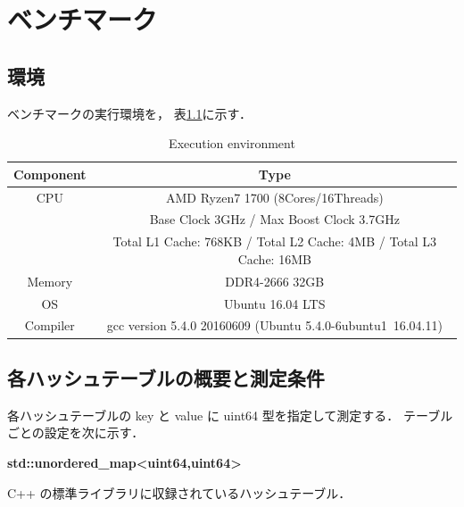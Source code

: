 \chapter{ベンチマーク}
\label{chap_Results}

\section{環境}

ベンチマークの実行環境を，
表\ref{table_env}に示す．

\begin{table}[hbtp]
  \label{table_env}
  \begin{center}
    \caption{Execution environment}
    \begin{tabular}{cc} \hline
      Component & Type \rule[0pt]{0pt}{0pt} \\ \hline
      CPU & AMD Ryzen7 1700 (8Cores/16Threads) \rule[0pt]{0pt}{0pt} \\ 
      & Base Clock 3GHz / Max Boost Clock 3.7GHz \rule[0pt]{0pt}{0pt} \\
      & Total L1 Cache: 768KB / Total L2 Cache: 4MB / Total L3 Cache: 16MB \\
      Memory & DDR4-2666 32GB \rule[0pt]{0pt}{0pt} \\
      OS & Ubuntu 16.04 LTS \rule[0pt]{0pt}{0pt} \\
      Compiler & gcc version 5.4.0 20160609 (Ubuntu 5.4.0-6ubuntu1~16.04.11) \rule[0pt]{0pt}{0pt} \\ \hline
    \end{tabular}
  \end{center}
\end{table}


\section{各ハッシュテーブルの概要と測定条件}
各ハッシュテーブルの key と value に uint64 型を指定して測定する．
テーブルごとの設定を次に示す．
\leavevmode \newline

%
{\bf std::unordered\_map<uint64,uint64>}

C++ の標準ライブラリに収録されているハッシュテーブル．
\leavevmode \newline

